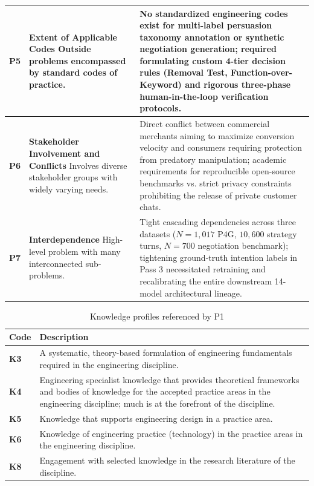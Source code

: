 \begin{table}[htbp]
\begin{tabularx}{\textwidth}{l>{\hsize}Y>{\hsize}Y}
    \midrule
    \textbf{P5} & \textbf{Extent of Applicable Codes} \newline Outside problems encompassed by standard codes of practice. & No standardized engineering codes exist for multi-label persuasion taxonomy annotation or synthetic negotiation generation; required formulating custom 4-tier decision rules (Removal Test, Function-over-Keyword) and rigorous three-phase human-in-the-loop verification protocols. \\
    \midrule
    \textbf{P6} & \textbf{Stakeholder Involvement and Conflicts} \newline Involves diverse stakeholder groups with widely varying needs. & Direct conflict between commercial merchants aiming to maximize conversion velocity and consumers requiring protection from predatory manipulation; academic requirements for reproducible open-source benchmarks vs. strict privacy constraints prohibiting the release of private customer chats. \\
    \midrule
    \textbf{P7} & \textbf{Interdependence} \newline High-level problem with many interconnected sub-problems. & Tight cascading dependencies across three datasets ($N=1{,}017$ P4G, $10{,}600$ strategy turns, $N=700$ negotiation benchmark); tightening ground-truth intention labels in Pass 3 necessitated retraining and recalibrating the entire downstream 14-model architectural lineage. \\
    \bottomrule
  \end{tabularx}
\end{table}

\begin{table}[htbp]
  \centering
  \small
  \caption{Knowledge profiles referenced by P1}
  \label{tab:knowledge-profile}
  \begin{tabularx}{\textwidth}{lY}
    \toprule
    \textbf{Code} & \textbf{Description} \\
    \midrule
    \textbf{K3} & A systematic, theory-based formulation of engineering fundamentals required in the engineering discipline. \\
    \textbf{K4} & Engineering specialist knowledge that provides theoretical frameworks and bodies of knowledge for the accepted practice areas in the engineering discipline; much is at the forefront of the discipline. \\
    \textbf{K5} & Knowledge that supports engineering design in a practice area. \\
    \textbf{K6} & Knowledge of engineering practice (technology) in the practice areas in the engineering discipline. \\
    \textbf{K8} & Engagement with selected knowledge in the research literature of the discipline. \\
    \bottomrule
  \end{tabularx}
\end{table}

